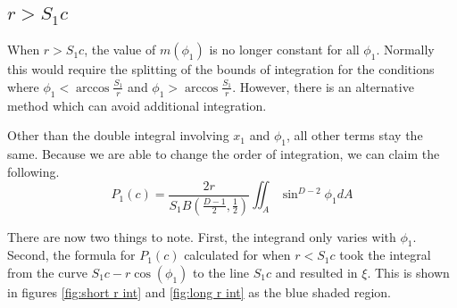 \documentclass{article}
\begin{document}
\subsection{$r>S_1c$} \label{s:long needle}
When $r>S_1c$, the value of $m(\phi_1)$ is no longer constant for all $\phi_1$. Normally this would require
the splitting of the bounds of integration for the conditions where $\phi_1<\arccos{\frac{S_1}{r}}$ and $\phi_1>\arccos{\frac{S_1}{r}}$. 
However, there is an alternative method which can avoid additional integration.

Other than the double integral involving $x_1$ and $\phi_1$, all other terms stay the same. Because we are
able to change the order of integration, we can claim the following.
\begin{equation}
	P_1(c) = \frac{2r}{S_1 B(\frac{D-1}{2}, \frac{1}{2})} \iint_{A}\sin ^ {D-2}\phi_1 dA
\end{equation}

There are now two things to note. First, the integrand only varies with $\phi_1$. Second, the 
formula for $P_1(c)$ calculated for when $r<S_1c$ took the integral from the curve $S_1c - r\cos(\phi_1)$
to the line $S_1c$ and resulted in $\xi$. This is shown in figures \ref{fig:short r int} and \ref{fig:long r int} as
the blue shaded region.
\end{document}
